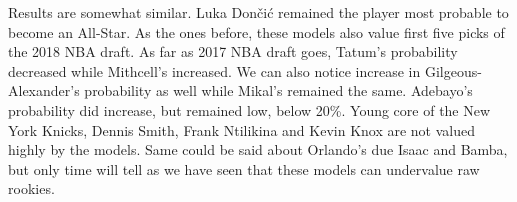 \documentclass[a4paper]{article}
\begin{document}
Results are somewhat similar. Luka Dončić remained the player most probable to become an All-Star. As the ones before, these models also value first five picks of the 2018 NBA draft. As far as 2017 NBA draft goes, Tatum's probability decreased while Mithcell's increased. We can also notice increase in Gilgeous-Alexander's probability as well while Mikal's remained the same. Adebayo's probability did increase, but remained low, below 20\%. Young core of the New York Knicks, Dennis Smith, Frank Ntilikina and Kevin Knox are not valued highly by the models. Same could be said about Orlando's due Isaac and Bamba, but only time will tell as we have seen that these models can undervalue raw rookies.

\pagebreak

\appendix


\appendix
\end{document}

